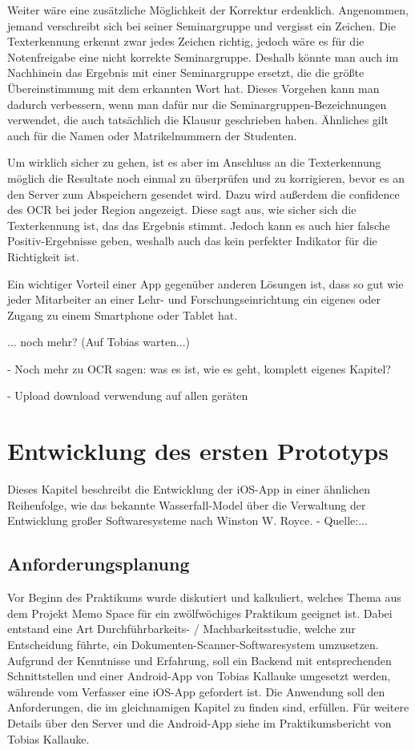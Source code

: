 \documentclass[nomenclature, oneside, 150]{HSMW-Thesis}
\begin{document}
	Weiter wäre eine zusätzliche Möglichkeit der Korrektur erdenklich. Angenommen, jemand verschreibt sich bei seiner Seminargruppe und vergisst ein Zeichen. Die Texterkennung erkennt zwar jedes Zeichen richtig, jedoch wäre es für die Notenfreigabe eine nicht korrekte Seminargruppe. Deshalb könnte man auch im Nachhinein das Ergebnis mit einer Seminargruppe ersetzt, die die größte Übereinstimmung mit dem erkannten Wort hat. Dieses Vorgehen kann man dadurch verbessern, wenn man dafür nur die Seminargruppen-Bezeichnungen verwendet, die auch tatsächlich die Klausur geschrieben haben. Ähnliches gilt auch für die Namen oder Matrikelnummern der Studenten.
	
	Um wirklich sicher zu gehen, ist es aber im Anschluss an die Texterkennung möglich die Resultate noch einmal zu überprüfen und zu korrigieren, bevor es an den Server zum Abspeichern gesendet wird. Dazu wird außerdem die confidence des OCR bei jeder Region angezeigt. Diese sagt aus, wie sicher sich die Texterkennung ist, das das Ergebnis stimmt. Jedoch kann es auch hier falsche Positiv-Ergebnisse geben, weshalb auch das kein perfekter Indikator für die Richtigkeit ist.
	
	Ein wichtiger Vorteil einer App gegenüber anderen Lösungen ist, dass so gut wie jeder Mitarbeiter an einer Lehr- und Forschungseinrichtung ein eigenes oder Zugang zu einem Smartphone oder Tablet hat.

		... noch mehr? (Auf Tobias warten...)
	
	- Noch mehr zu OCR sagen: was es ist, wie es geht, komplett eigenes Kapitel?

	- Upload download verwendung auf allen geräten



\chapter{Entwicklung des ersten Prototyps}
	Dieses Kapitel beschreibt die Entwicklung der iOS-App in einer ähnlichen Reihenfolge, wie das bekannte Wasserfall-Model über die Verwaltung der Entwicklung großer Softwaresysteme nach Winston W. Royce. - Quelle:...
	
	\section{Anforderungsplanung}
	Vor Beginn des Praktikums wurde diskutiert und kalkuliert, welches Thema aus dem Projekt Memo Space für ein zwölfwöchiges Praktikum geeignet ist. Dabei entstand eine Art Durchführbarkeits- / Machbarkeitsstudie, welche zur Entscheidung führte, ein Dokumenten-Scanner-Softwaresystem umzusetzen. Aufgrund der Kenntnisse und Erfahrung, soll ein Backend mit entsprechenden Schnittstellen und einer Android-App von Tobias Kallauke umgesetzt werden, währende vom Verfasser eine iOS-App gefordert ist. Die Anwendung soll den Anforderungen, die im gleichnamigen Kapitel zu finden sind, erfüllen. Für weitere Details über den Server und die Android-App siehe im Praktikumsbericht von Tobias Kallauke.
\end{document}

